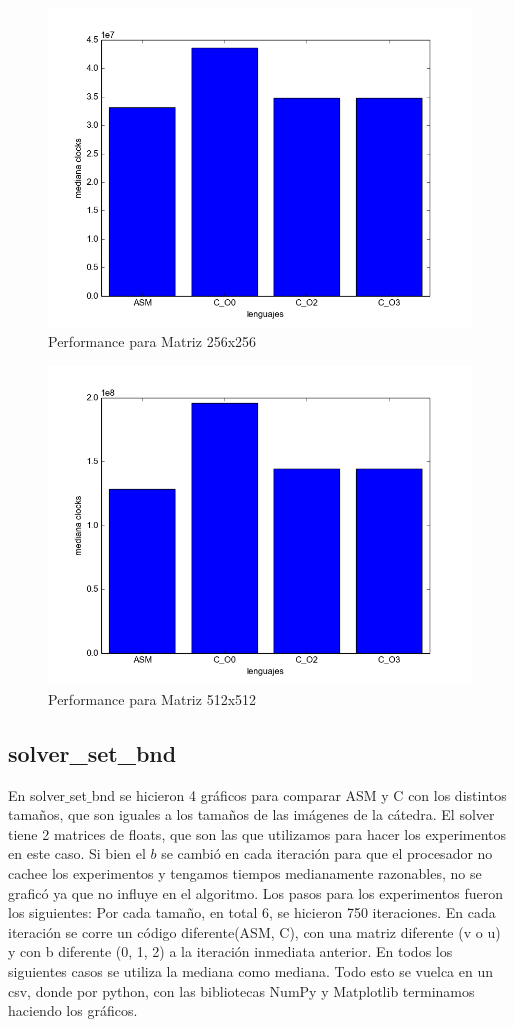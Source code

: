 \pagebreak

\begin{figure}[h]
  \centering
    \includegraphics[width=.6\linewidth]{Matriz_256.png}
    \caption{Performance para Matriz 256x256}
    \label{fig:M256}
\end{figure}

\begin{figure}[h]
  \centering
    \includegraphics[width=.6\linewidth]{Matriz_512.png}
    \caption{Performance para Matriz 512x512}
    \label{fig:M512}
\end{figure}

\newpage

\subsection{solver\_set\_bnd}

En solver$\_$set$\_$bnd se hicieron 4 gráficos para comparar ASM y C con los distintos tamaños, que son iguales a los tamaños de las imágenes de la cátedra. El solver tiene 2 matrices de floats, que son las que utilizamos para hacer los experimentos en este caso. Si bien el $b$ se cambió en cada iteración para que el procesador no cachee los experimentos y tengamos tiempos medianamente razonables, no se graficó ya que no influye en el algoritmo.
Los pasos para los experimentos fueron los siguientes:
Por cada tamaño, en total 6, se hicieron 750 iteraciones. En cada iteración se corre un código diferente(ASM, C), con una matriz diferente (v o u) y con b diferente (0, 1, 2) a la iteración inmediata anterior. En todos los siguientes casos se utiliza la mediana como mediana.
Todo esto se vuelca en un csv, donde por python, con las bibliotecas NumPy y Matplotlib terminamos haciendo los gráficos. 

